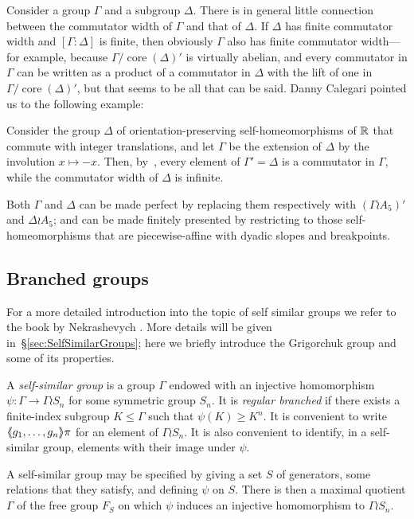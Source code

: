 \documentclass[a4paper,11pt]{amsart}
\begin{document}
Consider a group $\Gamma$ and a subgroup $\Delta$. There is in general
little connection between the commutator width of $\Gamma$ and that of
$\Delta$. If $\Delta$ has finite commutator width and
$[\Gamma:\Delta]$ is finite, then obviously $\Gamma$ also has finite
commutator width---for example, because
$\Gamma/\operatorname{core}(\Delta)'$ is virtually abelian, and every
commutator in $\Gamma$ can be written as a product of a commutator in
$\Delta$ with the lift of one in
$\Gamma/\operatorname{core}(\Delta)'$, but that seems to be all that
can be said. Danny Calegari pointed us to the following example:
\begin{ex}
  Consider the group $\Delta$ of orientation-preserving
  self-homeomorphisms of $\mathbb{R}$ that commute with integer translations,
  and let $\Gamma$ be the extension of $\Delta$ by the involution
  $x\mapsto-x$. Then, by~\cite[Theorems~2.3
  and~2.4]{Eisenbud-Hirsch-Neumann:SeifertBundles}, every element of
  $\Gamma'=\Delta$ is a commutator in $\Gamma$, while the commutator
  width of $\Delta$ is infinite.

  Both $\Gamma$ and $\Delta$ can be made perfect by replacing them
  respectively with $(\Gamma\wr A_5)'$ and $\Delta\wr A_5$; and can be
  made finitely presented by restricting to those self-homeomorphisms
  that are piecewise-affine with dyadic slopes and breakpoints.
\end{ex}

\subsection{Branched groups}
For a more detailed introduction into the topic of self similar groups
we refer to the book by Nekrashevych
\cite{Nekrashevych:SelfSimilarGroups}. More details will be given
in~\S\ref{sec:SelfSimilarGroups}; here we briefly introduce
the Grigorchuk group and some of its properties.

A \emph{self-similar group} is a group $\Gamma$ endowed with an
injective homomorphism $\psi\colon\Gamma\to\Gamma\wr S_n$ for some
symmetric group $S_n$. It is \emph{regular branched} if there exists a
finite-index subgroup $K\le\Gamma$ such that $\psi(K)\ge K^n$. It is
convenient to write $\langle\negthickspace\langle g_1,\dots,g_n\rangle\negthickspace\rangle\pi$ for an element of
$\Gamma\wr S_n$. It is also convenient to identify, in a self-similar
group, elements with their image under $\psi$.

A self-similar group may be specified by giving a set $S$ of
generators, some relations that they satisfy, and defining $\psi$ on
$S$. There is then a maximal quotient $\Gamma$ of the free group $F_S$
on which $\psi$ induces an injective homomorphism to $\Gamma\wr S_n$.
\end{document}
